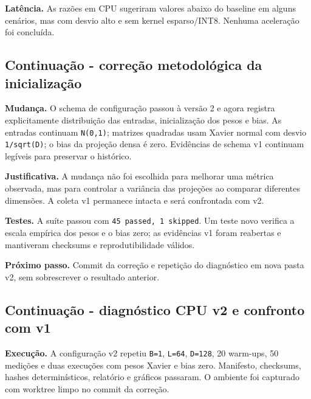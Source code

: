 \textbf{Latência.} As razões em CPU sugeriram valores abaixo do baseline em alguns cenários, mas com desvio alto e sem kernel esparso/INT8. Nenhuma aceleração foi concluída.



\subsection{Continuação - correção metodológica da inicialização}







\textbf{Mudança.} O schema de configuração passou à versão 2 e agora registra explicitamente distribuição das entradas, inicialização dos pesos e bias. As entradas continuam \texttt{N(0,1)}; matrizes quadradas usam Xavier normal com desvio \texttt{1/\allowbreak{}sqrt(D)}; o bias da projeção densa é zero. Evidências de schema v1 continuam legíveis para preservar o histórico.





\textbf{Justificativa.} A mudança não foi escolhida para melhorar uma métrica observada, mas para controlar a variância das projeções ao comparar diferentes dimensões. A coleta v1 permanece intacta e será confrontada com v2.





\textbf{Testes.} A suíte passou com \texttt{45 passed, 1 skipped}. Um teste novo verifica a escala empírica dos pesos e o bias zero; as evidências v1 foram reabertas e mantiveram checksums e reprodutibilidade válidos.




\textbf{Próximo passo.} Commit da correção e repetição do diagnóstico em nova pasta v2, sem sobrescrever o resultado anterior.



\subsection{Continuação - diagnóstico CPU v2 e confronto com v1}






\textbf{Execução.} A configuração v2 repetiu \texttt{B=1}, \texttt{L=64}, \texttt{D=128}, 20 warm-ups, 50 medições e duas execuções com pesos Xavier e bias zero. Manifesto, checksums, hashes determinísticos, relatório e gráficos passaram. O ambiente foi capturado com worktree limpo no commit da correção.






